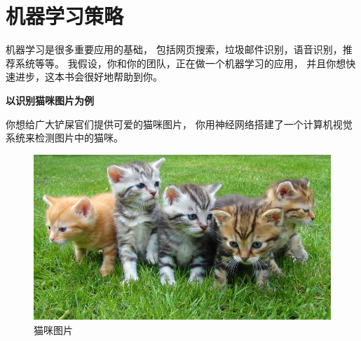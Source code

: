 \chapter{机器学习策略}

机器学习是很多重要应用的基础，
包括网页搜索，垃圾邮件识别，语音识别，推荐系统等等。
我假设，你和你的团队，正在做一个机器学习的应用，
并且你想快速进步，这本书会很好地帮助到你。

\textbf{以识别猫咪图片为例}

你想给广大铲屎官们提供可爱的猫咪图片，
你用神经网络搭建了一个计算机视觉系统来检测图片中的猫咪。
\begin{figure}[h]
	\centering
	\includegraphics[width=0.7\linewidth]{TeX_files/pic/1.1}
	\caption{猫咪图片}
	\label{fig:1}
\end{figure}

